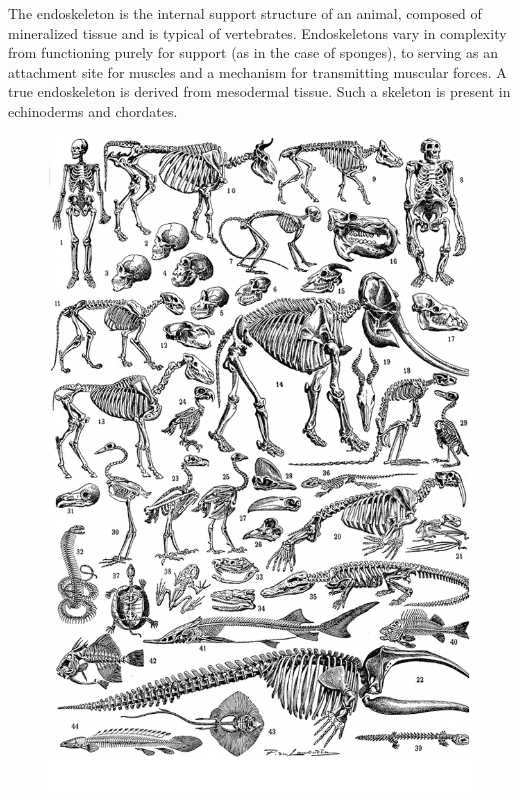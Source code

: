 The endoskeleton is the internal support structure of an animal, composed of mineralized tissue and is typical of vertebrates. Endoskeletons vary in complexity from functioning purely for support (as in the case of sponges), to serving as an attachment site for muscles and a mechanism for transmitting muscular forces. A true endoskeleton is derived from mesodermal tissue. Such a skeleton is present in echinoderms and chordates.



\begin{figure}

{\centering \includegraphics[width=0.7\linewidth]{./figures/locomotion/Skeletons} 

}


\end{figure}
